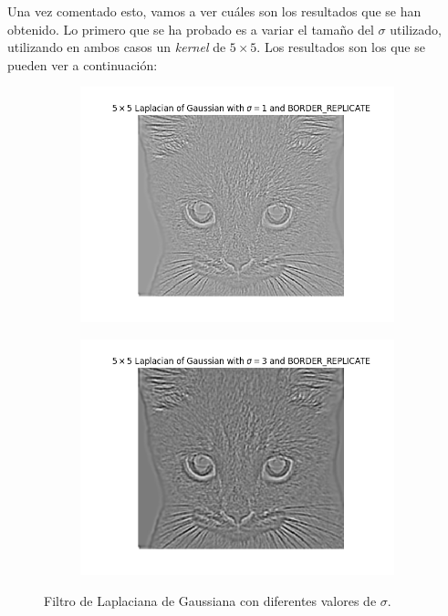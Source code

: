 \documentclass[11pt,a4paper]{article}
\begin{document}
Una vez comentado esto, vamos a ver cuáles son los resultados que se han obtenido. Lo primero que se ha probado es a variar
el tamaño del $\sigma$ utilizado, utilizando en ambos casos un \textit{kernel} de $5 \times 5$. Los resultados son los que
se pueden ver a continuación:

\begin{figure}[H]
\begin{subfigure}{.5\textwidth}
	\centering
	\includegraphics[scale=0.45]{img/laplacian-sigma1.png}
	\label{fig:laplacian-sigma1}
\end{subfigure}
\begin{subfigure}{.5\textwidth}
	\centering
	\includegraphics[scale=0.45]{img/laplacian-sigma2.png}
	\label{fig:laplacian-sigma2}
\end{subfigure}
\caption{Filtro de Laplaciana de Gaussiana con diferentes valores de $\sigma$.}
\label{fig:laplacian-sigma}
\end{figure}
\end{document}
